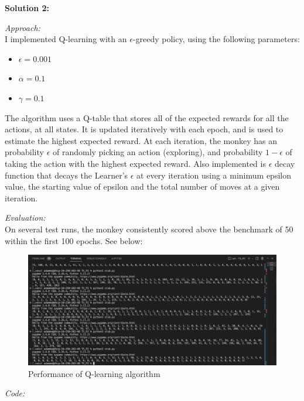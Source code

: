 \documentclass[submit]{harvardml}
\begin{document}
\textbf{Solution 2:}

\emph{Approach:} \\

I implemented Q-learning with an $\epsilon$-greedy policy, using the following parameters:

\begin{itemize}
    \item $\epsilon = 0.001$
    \item $\alpha = 0.1$
    \item $\gamma = 0.1$
\end{itemize}

The algorithm uses a Q-table that stores all of the expected rewards for all the actions, at all states. It is updated iteratively with each epoch, and is used to estimate the highest expected reward. At each iteration, the monkey has an probability $\epsilon$ of randomly picking an action (exploring), and probability $1 - \epsilon$ of taking the action with the highest expected reward. Also implemented is $\epsilon$ decay function that decays the Learner's $\epsilon$ at every iteration using a minimum epsilon value, the starting value of epsilon and the total number of moves at a given iteration.

\emph{Evaluation:}\\

On several test runs, the monkey consistently scored above the benchmark of 50 within the first 100 epochs. See below:

\begin{figure}[h!]
    \centering
    \includegraphics[width=12cm]{hw5/figures/HW5_P2_Performance.png}
    \caption{Performance of Q-learning algorithm}
    \label{fig:p2_performance}
\end{figure}



\emph{Code:}

\end{document}
